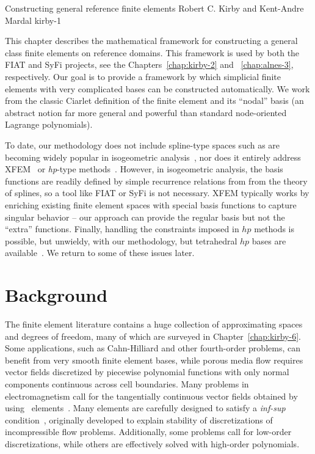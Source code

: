 \newcommand{\mathbfx}[1]{{\mbox{\boldmath $#1$}}}
\renewcommand{\P}{{\mathbb P}}
\renewcommand{\H}{{\mathbb H}}
\newcommand{\GG}{\mathbf{G}}

              {Constructing general reference finite elements}
              {Robert C. Kirby and Kent-Andre Mardal}
              {kirby-1}


This chapter describes the mathematical framework for constructing a
general class finite elements on reference domains. This framework is used
by both the FIAT and SyFi projects, see the Chapters~\ref{chap:kirby-2}
and ~\ref{chap:alnes-3}, respectively.  Our goal is to provide a framework
by which simplicial finite elements with very complicated bases can be
constructed automatically.  We work from the classic Ciarlet definition
of the finite element and its ``nodal'' basis (an abstract notion far more
general and powerful than standard node-oriented Lagrange polynomials).

To date, our methodology does not include spline-type
spaces such as are becoming widely popular in isogeometric
analysis~\citep{HughesCottrellBazilevs2005}, nor does it entirely
address XFEM~\citep{ChessaSmolinskiBelytschko2002} or {\em hp}-type
methods~\citep{Schwab1998}.  However, in isogeometric analysis, the
basis functions are readily defined by simple recurrence relations
from from the theory of splines, so a tool like FIAT or SyFi is not
necessary.  XFEM typically works by enriching existing finite element
spaces with special basis functions to capture singular behavior -- our
approach can provide the regular basis but not the ``extra'' functions.
Finally, handling the constraints imposed in $hp$ methods is possible,
but unwieldy, with our methodology, but tetrahedral $hp$ bases are
available~\citep{AinsworthCoyle2003}.  We return to some of these
issues later.

\section{Background}
The finite element literature contains a huge collection of
approximating spaces and degrees of freedom, many of which are
surveyed in Chapter~\ref{chap:kirby-6}.  Some applications, such
as Cahn-Hilliard and other fourth-order problems, can benefit from
very smooth finite element bases, while porous media flow requires
vector fields discretized by piecewise polynomial functions with only
normal components continuous across cell boundaries.  Many problems
in electromagnetism call for the tangentially continuous vector fields
obtained by using \nedelec\ elements~\citep{Nedelec1980,Nedelec1986}.
Many elements are carefully designed to satisfy a \emph{inf-sup}
condition~\citep{BrezziFortin1991,GiraultRaviart1986}, originally
developed to explain stability of discretizations of incompressible flow
problems.  Additionally, some problems call for low-order discretizations,
while others are effectively solved with high-order polynomials.

